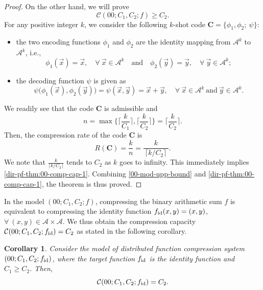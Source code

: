 \documentclass[11pt,draftclsnofoot,onecolumn]{IEEEtran}
\newtheorem{cor}{Corollary}
\newcommand{\mbC}{\mathbf{C}}
\begin{document}
\begin{proof}
  On the other hand, we will prove
  \begin{equation}
  \mathcal{C}(00;C_1,C_2;f)\geq C_2.\label{dir-pf-thm:00-comp-cap-1}
  \end{equation}
For any positive integer $k$, we consider the following $k$-shot code $\mbC=\big\{\phi_1,\phi_2;~\psi\big\}$:
 \begin{itemize}
 \item the two encoding functions $\phi_1$ and $\phi_2$ are the identity mapping from $\mathcal{A}^k$ to $\mathcal{A}^k$, i.e.,
\begin{equation*}
\phi_{1}(\vec{x})=\vec{x},\quad\forall~ \vec{x}\in\mathcal{A}^k\quad\text{and}\quad
\phi_{2}(\vec{y})=\vec{y},\quad\forall ~\vec{y}\in\mathcal{A}^k;
\end{equation*}
\item
the decoding function $\psi$ is given as
\begin{equation*}
\psi\big(\phi_{1}(\vec{x}),\phi_{2}(\vec{y})\big)=\psi(\vec{x},\vec{y})=\vec{x}+\vec{y},
\quad\forall~\vec{x}\in\mathcal{A}^k~\text{and}~\vec{y}\in\mathcal{A}^k.
\end{equation*}
\end{itemize}
We readily see that the code $\mbC$  is admissible and
\begin{equation*}
n=\max\bigg\{\bigg\lceil\frac{k}{C_1}\bigg\rceil,\bigg\lceil\frac{k}{C_2}\bigg\rceil\bigg\}
=\bigg\lceil\frac{k}{C_2}\bigg\rceil.
\end{equation*}
Then, the compression rate of the code $\mbC$ is
\begin{equation*}
R(\mbC)=\frac{k}{n}=\dfrac{k}{~\big\lceil k/C_2\big\rceil~}.
\end{equation*}
We note that $\frac{k}{\lceil k/C_2\rceil}$ tends to $C_2$ as $k$ goes to infinity. This immediately implies \eqref{dir-pf-thm:00-comp-cap-1}. Combining \eqref{00-mod-upp-bound} and \eqref{dir-pf-thm:00-comp-cap-1}, the theorem is thus proved.
\end{proof}

In the model $(00;C_1,C_2;f)$, compressing the binary arithmetic sum $f$ is equivalent to compressing the identity function $f_{\rm{\text{id}}}(x,y)=(x,y)$, $\forall~(x,y)\in \mathcal{A} \times \mathcal{A}$. We thus obtain the compression capacity $\mathcal{C}(00;C_1,C_2;f_{\rm{\text{id}}})=C_2$ as stated in the following corollary.

\begin{cor}\label{cor1}
 Consider the model of distributed function compression system $(00;C_{1}, C_{2}; f_{\emph{\rm{\text{id}}}})$, where the target function $f_{\emph{\rm{\text{id}}}}$ is the identity function and $C_1\geq C_2$. Then,
 \begin{equation*}
 \mathcal{C}(00;C_1,C_2;f_{\emph{\rm{\text{id}}}})=C_2.
 \end{equation*}
\end{cor}
\end{document}
